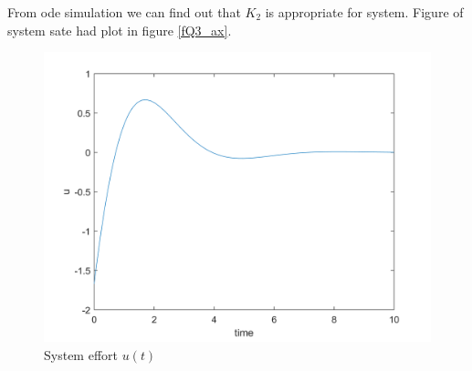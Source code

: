 From ode simulation we can find out that $K_2$ is appropriate for system. Figure of system sate had plot in figure \ref{fQ3_ax}. 
\begin{figure}[H]
	\caption{System effort $u(t)$}
	\centering
	\includegraphics[width=12cm]{../Code/Q3/figures/uODE.png}
\end{figure}